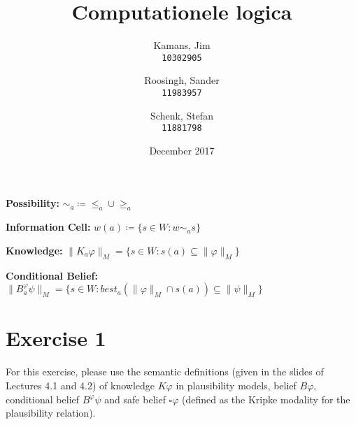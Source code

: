 \documentclass[leqno]{article}
\title{Computationele logica}
\author{
    Kamans, Jim\\
    \texttt{10302905}
    \and
    Roosingh, Sander\\
    \texttt{11983957}
    \and
    Schenk, Stefan\\
    \texttt{11881798}
}
\date{December 2017}
\begin{document}
\maketitle

\textbf{Possibility:} $\sim_a \coloneqq \leq_a \cup \geq_a$

\textbf{Information Cell:} $w(a) \coloneqq \{s\in W:w\sim_a s\}$

\textbf{Knowledge:} $\lVert K_a \varphi \rVert_M = \{s\in W:s(a) \subseteq
\lVert \varphi \rVert_M\}$

\textbf{Conditional Belief:} $\lVert B_a^\varphi \psi \rVert_M = \{s \in
W:best_a(\lVert\varphi\rVert_M \cap s(a)) \subseteq \lVert\psi\rVert_M\}$


\section*{Exercise 1}
For this exercise, please use the semantic definitions (given in the slides of 
Lectures 4.1 and 4.2) of knowledge $K\varphi$ in plausibility models, belief 
$B\varphi$, conditional belief $B^\varphi \psi$ and safe belief $\square 
\varphi$ (defined as the Kripke modality for the plausibility relation).
\end{document}
